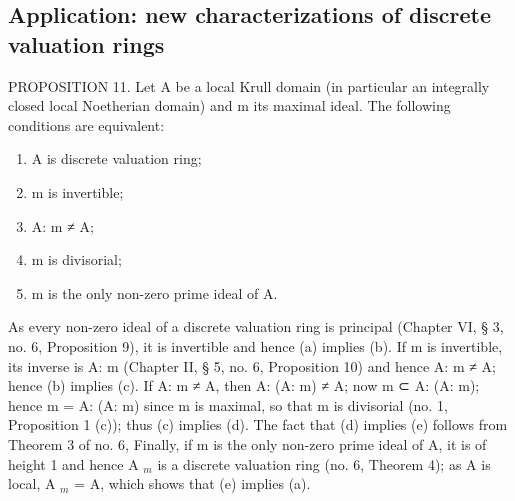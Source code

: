 \subsection{Application: new characterizations of discrete valuation rings}

PROPOSITION 11. Let A be a local Krull domain (in particular an integrally closed local Noetherian domain) and m its maximal ideal. The following conditions are equivalent:

\begin{enumerate}
\def\labelenumi{(\alph{enumi})}
\item
  A is discrete valuation ring;
\item
  m is invertible;
\item
  A: m ≠ A;
\item
  m is divisorial;
\item
  m is the only non-zero prime ideal of A.
\end{enumerate}

As every non-zero ideal of a discrete valuation ring is principal (Chapter VI, § 3, no. 6, Proposition 9), it is invertible and hence (a) implies (b). If m is invertible, its inverse is A: m (Chapter II, § 5, no. 6, Proposition 10) and hence A: m ≠ A; hence (b) implies (c). If A: m ≠ A, then A: (A: m) ≠ A; now m ⊂ A: (A: m); hence m = A: (A: m) since m is maximal, so that m is divisorial (no. 1, Proposition 1 (c)); thus (c) implies (d). The fact that (d) implies (e) follows from Theorem 3 of no. 6, Finally, if m is the only non-zero prime ideal of A, it is of height 1 and hence A \(_{m}\) is a discrete valuation ring (no. 6, Theorem 4); as A is local, A \(_{m}\) = A, which shows that (e) implies (a).

